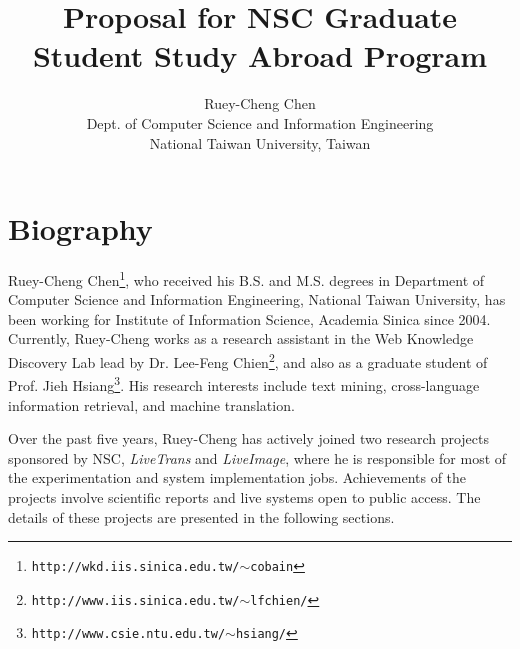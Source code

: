 \documentclass{article}[12pt]
\newcommand\url[1]{\texttt{#1}}
\begin{document}
\title{Proposal for NSC Graduate Student Study Abroad Program}
\author{Ruey-Cheng Chen\\Dept. of Computer Science and Information Engineering\\National Taiwan University, Taiwan}
\maketitle

\section{Biography}

Ruey-Cheng Chen\footnote{\url{http://wkd.iis.sinica.edu.tw/$\sim$cobain}}, who
received his B.S. and M.S. degrees in Department of Computer Science and
Information Engineering, National Taiwan University, has been working for
Institute of Information Science, Academia Sinica since 2004.  Currently,
Ruey-Cheng works as a research assistant in the Web Knowledge Discovery Lab
lead by Dr. Lee-Feng
Chien\footnote{\url{http://www.iis.sinica.edu.tw/$\sim$lfchien/}}, and also as
a graduate student of Prof. Jieh
Hsiang\footnote{\url{http://www.csie.ntu.edu.tw/$\sim$hsiang/}}.  His research
interests include text mining, cross-language information retrieval, and
machine translation.

Over the past five years, Ruey-Cheng has actively joined two research projects
sponsored by NSC, \emph{LiveTrans} and \emph{LiveImage}, where he is
responsible for most of the experimentation and system implementation jobs.
Achievements of the projects involve scientific reports and live systems open
to public access.  The details of these projects are presented in the following
sections.
\end{document}

